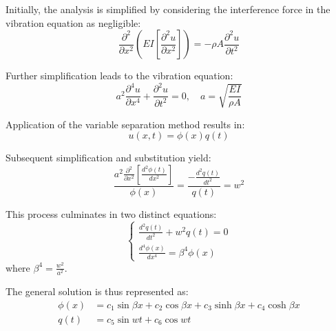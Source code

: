 \documentclass[conference]{IEEEtran}
\begin{document}
Initially, the analysis is simplified by considering the interference force in the vibration equation as negligible:
\begin{equation}
\frac{\partial^2}{\partial x^2} \left( EI \left[ \frac{\partial^2 u}{\partial x^2} \right] \right) = -\rho A \frac{\partial^2 u}{\partial t^2}
\end{equation}

Further simplification leads to the vibration equation:
\begin{equation}
a^2\frac{\partial^4 u}{\partial x^4} + \frac{\partial^2 u}{\partial t^2} = 0, \quad a = \sqrt{\frac{EI}{\rho A}}
\end{equation}

Application of the variable separation method results in:
\begin{equation}
u(x, t) = \phi(x) q(t)
\end{equation}

Subsequent simplification and substitution yield:
\begin{equation}
\frac{a^2 \frac{\partial^2}{\partial x^2} \left[ \frac{d^2 \phi (t)}{dx^2} \right]}{\phi (x)} = \frac{- \frac{d^2 q(t)}{dt^2}}{q (t)} = w^2
\end{equation}

This process culminates in two distinct equations:
\begin{equation}
\left\{
\begin{array}{l}
\frac{d^2 q(t)}{dt^2} + w^2 q(t) = 0 \\
\frac{d^4 \phi(x)}{dx^4} = \beta^4 \phi(x)
\end{array}
\right.
\end{equation}
where \( \beta^4 = \frac{w^2}{a^2} \).

The general solution is thus represented as:
\begin{equation}
\begin{split}
\phi(x) &= c_1 \sin \beta x + c_2 \cos \beta x + c_3 \sinh \beta x + c_4 \cosh \beta x \\
q(t) &= c_5 \sin wt + c_6 \cos wt
\end{split}
\end{equation}
\end{document}

